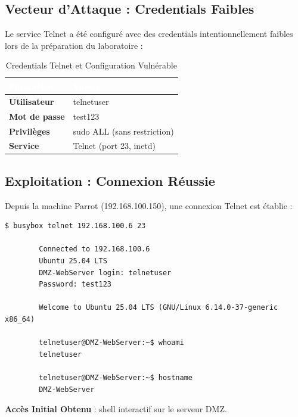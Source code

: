 \documentclass[12pt,a4paper,openany]{report}
\begin{document}
\subsection{Vecteur d'Attaque : Credentials Faibles}

Le service Telnet a été configuré avec des credentials intentionnellement faibles lors de la préparation du laboratoire :

\begin{table}[H]
	\centering
	\renewcommand{\arraystretch}{1.8}
	\setlength{\tabcolsep}{10pt}
	\setlength{\arrayrulewidth}{0.8pt}
	\begin{tabularx}{\textwidth}{|>{\bfseries}p{4cm}|X|}
		\arrayrulecolor{tableborder}
		\hline
		\rowcolor{tableheadbg}
		\textcolor{white}{\textbf{Paramètre}} & \textcolor{white}{\textbf{Valeur}} \\
		\hline
		\rowcolor{tablerowalt}
		Utilisateur  & telnetuser \\
		\hline
		Mot de passe & test123 \\
		\hline
		\rowcolor{tablerowalt}
		Privilèges   & sudo ALL (sans restriction) \\
		\hline
		Service      & Telnet (port 23, inetd) \\
		\hline
	\end{tabularx}
	\caption{Credentials Telnet et Configuration Vulnérable}
	\label{tab:telnet-creds}
\end{table}

\subsection{Exploitation : Connexion Réussie}

Depuis la machine Parrot (192.168.100.150), une connexion Telnet est établie :

\begin{lstlisting}[caption=Connexion Telnet reussie vers le serveur DMZ]
		$ busybox telnet 192.168.100.6 23
		
		Connected to 192.168.100.6
		Ubuntu 25.04 LTS
		DMZ-WebServer login: telnetuser
		Password: test123
		
		Welcome to Ubuntu 25.04 LTS (GNU/Linux 6.14.0-37-generic x86_64)
		
		telnetuser@DMZ-WebServer:~$ whoami
		telnetuser
		
		telnetuser@DMZ-WebServer:~$ hostname
		DMZ-WebServer
	\end{lstlisting}

\textcolor{success}{\checkmark} \textbf{Accès Initial Obtenu} : shell interactif sur le serveur DMZ.
\end{document}
